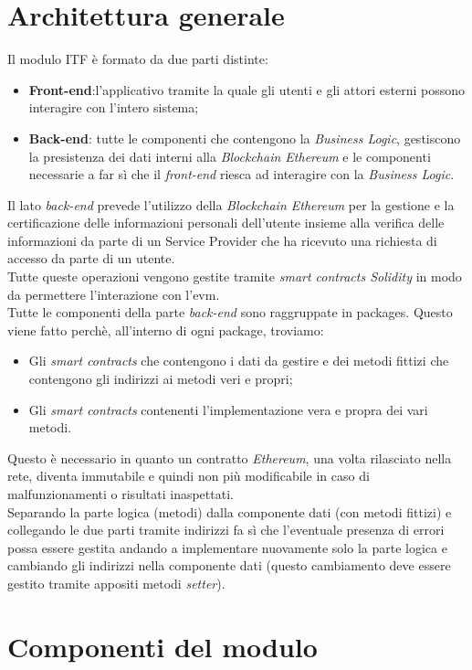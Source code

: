 \section{Architettura generale}
Il modulo \gls{ITF} è formato da due parti distinte:
\begin{itemize}
	\item \textbf{Front-end}:l'applicativo tramite la quale gli utenti e gli attori esterni possono interagire con l'intero sistema;
	\item \textbf{Back-end}: tutte le componenti che contengono la \textit{Business Logic}, gestiscono la presistenza dei dati interni alla \textit{Blockchain Ethereum} e le componenti necessarie a far sì che il \textit{front-end} riesca ad interagire con la \textit{Business Logic}.
\end{itemize}
Il lato \textit{back-end} prevede l'utilizzo della \textit{Blockchain Ethereum} per la gestione e la certificazione delle informazioni personali dell'utente insieme alla verifica delle informazioni da parte di un Service Provider che ha ricevuto una richiesta di accesso da parte di un utente.\\
Tutte queste operazioni vengono gestite tramite \textit{smart contracts Solidity} in modo da permettere l'interazione con l'\gls{evm}.\\
Tutte le componenti della parte \textit{back-end} sono raggruppate in packages. Questo viene fatto perchè, all'interno di ogni package, troviamo:
\begin{itemize}
	\item Gli \textit{smart contracts} che contengono i dati da gestire e dei metodi fittizi che contengono gli indirizzi ai metodi veri e propri;
	\item Gli \textit{smart contracts} contenenti l'implementazione vera e propra dei vari metodi.
\end{itemize}
Questo è necessario in quanto un contratto \textit{Ethereum}, una volta rilasciato nella rete, diventa immutabile e quindi non più modificabile in caso di malfunzionamenti o risultati inaspettati.\\
Separando la parte logica (metodi) dalla componente dati (con metodi fittizi) e collegando le due parti tramite indirizzi fa sì che l'eventuale presenza di errori possa essere gestita andando a implementare nuovamente solo la parte logica e cambiando gli indirizzi nella componente dati (questo cambiamento deve essere gestito tramite appositi metodi \textit{setter}).
\newpage
\section{Componenti del modulo}
